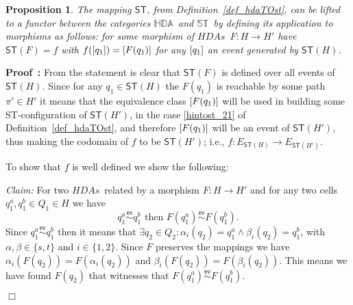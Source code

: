 \documentclass[submission,copyright,creativecommons]{eptcs}
\newtheorem{proposition}[theorem]{Proposition}
\newenvironment{proof}[1][\!\!\,]{\vspace{1ex}\noindent\textbf{Proof #1: }}{\hfill$\Box$\vspace{2ex}}
\newcounter{case}
\newcommand\HDAs{\ensuremath{\mathit{HDAs}}}
\newcommand\allST{\ensuremath{\mathbb{ST}}}
\newcommand\allHDA{\ensuremath{\mathbb{HDA}}}
\newcommand\hintost{\ensuremath{\mathsf{ST}}}
\newcommand\eventEquivHDAs{\ensuremath{\stackrel{\mathsf{ev}}{\sim}}}
\newcommand{\equivClass}[2][]{\ensuremath{[#2]\ifthenelse{\equal{#1}{}}{}{_{#1}}}}
\newcommand\categoryST{\ensuremath{\allST}}
\newcommand\categoryHDA{\ensuremath{\allHDA}}
\begin{document}
\begin{proposition}
The mapping \hintost, from Definition~\ref{def_hdaTOst}, can be lifted to a functor between the categories \categoryHDA\ and \categoryST\ by defining its application to morphisms as follows: for some morphism of \HDAs\ $F:H\rightarrow H'$ have $\hintost(F)=f$ with $f(\equivClass{q_{1}})=\equivClass{F(q_{1})}$ for any $\equivClass{q_{1}}$ an event generated by $\hintost(H)$.
\end{proposition}

\begin{proof}
From the statement is clear that $\hintost(F)$ is defined over all events of $\hintost(H)$. Since for any $q_{1}\in\hintost(H)$ the $F(q_{1})$ is reachable by some path $\pi'\in H'$ it means that the equivalence class $\equivClass{F(q_{1})}$ will be used in building some ST-configuration of $\hintost(H')$, in the case \ref{hintost_21} of Definition~\ref{def_hdaTOst}, and therefore $\equivClass{F(q_{1})}$ will be an event of $\hintost(H')$, thus making the codomain of $f$ to be $\hintost(H')$; i.e., $f:E_{\hintost(H)}\rightarrow E_{\hintost(H')}$.

To show that $f$ is well defined we show the following:

\vspace{1ex}
\noindent\textit{Claim:}\hspace{1ex} For two \HDAs\ related by a morphism $F:H\rightarrow H'$ and for any two cells $q_{1}^{a},q_{1}^{b}\in Q_{1}\in H$ we have 
\[
q_{1}^{a}\eventEquivHDAs q_{1}^{b} \mbox{ then } F(q_{1}^{a})\eventEquivHDAs F(q_{1}^{b}).
\]
\vspace{0.5ex}
Since $q_{1}^{a}\eventEquivHDAs q_{1}^{b}$ then it means that $\exists q_{2}\in Q_{2}:\alpha_{i}(q_{2})=q_{1}^{a}\wedge\beta_{i}(q_{2})=q_{1}^{b}$, with $\alpha,\beta\in\{s,t\}$ and $i\in\{1,2\}$. Since $F$ preserves the mappings we have $\alpha_{i}(F(q_{2}))=F(\alpha_{i}(q_{2}))$ and $\beta_{i}(F(q_{2}))=F(\beta_{i}(q_{2}))$. This means we have found $F(q_{2})$ that witnesses that $F(q_{1}^{a})\eventEquivHDAs F(q_{1}^{b})$.


\end{proof}
\end{document}
